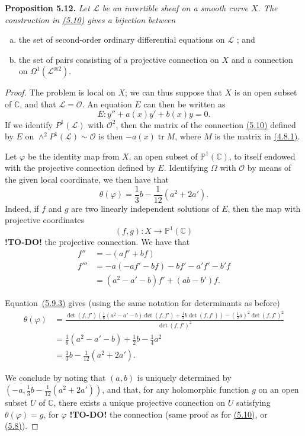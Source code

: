 \documentclass{report}
\newenvironment{itenv}[1]
  {\phantomsection\par\medskip\noindent\textbf{#1.}\itshape}
  {\par\medskip}
\newcommand{\scr}[1]{{\mathscr{#1}}}
\renewcommand{\cal}[1]{{\mathcal{#1}}}
\newcommand{\PP}{\mathbb{P}}
\newcommand{\CC}{\mathbb{C}}
\newcommand{\detrow}[2]{\operatorname{det}(#1,#2)}
\DeclareMathOperator{\tr}{tr}
\newcommand{\todo}{\textbf{ !TO-DO! }}
\newcommand{\oldpage}[1]{\marginpar{\footnotesize$\Big\vert$ \textit{p.~#1}}}
\begin{document}
\begin{itenv}{Proposition 5.12}
\label{I.5.12}
  Let $\scr{L}$ be an invertible sheaf on a smooth curve $X$.
  The construction in \hyperref[I.5.10]{(5.10)} gives a bijection between
  \begin{enumerate}[a)]
    \item the set of second-order ordinary differential equations on $\scr{L}$ ; and
\oldpage{36}
    \item the set of pairs consisting of a projective connection on $X$ and a connection on $\Omega^1(\scr{L}^{\otimes2})$.
  \end{enumerate}
\end{itenv}

\begin{proof}
  The problem is local on $X$;
  we can thus suppose that $X$ is an open subset of $\CC$, and that $\scr{L}=\cal{O}$.
  An equation $E$ can then be written as
  \[
    E\colon y'' + a(x)y' + b(x)y = 0.
  \]
  If we identify $P^1(\scr{L})$ with $\cal{O}^2$, then the matrix of the connection \hyperref[I.5.10]{(5.10)} defined by $E$ on $\wedge^2 P^1(\scr{L})\sim\cal{O}$ is then $-a(x)\tr M$, where $M$ is the matrix in \hyperref[I.4.8.1]{(4.8.1)}.

  Let $\varphi$ be the identity map from $X$, an open subset of $\PP^1(\CC)$, to itself endowed with the projective connection defined by $E$.
  Identifying $\Omega$ with $\cal{O}$ by means of the given local coordinate, we then have that
  \[
  \label{I.5.12.1}
    \theta(\varphi) = \frac13b - \frac{1}{12}(a^2+2a').
  \tag{5.12.1}
  \]
  Indeed, if $f$ and $g$ are two linearly independent solutions of $E$, then the map with projective coordinates
  \[
    (f,g)\colon X\to\PP^1(\CC)
  \]
  \todo the projective connection.
  We have that
  \[
    \begin{aligned}
      f''
      &= -(af'+bf)
    \\f'''
      &= -a(-af'-bf) - bf' - a'f' - b'f
    \\&= (a^2-a'-b)f' + (ab-b')f.
    \end{aligned}
  \]

  Equation~\hyperref[I.5.9.3]{(5.9.3)} gives (using the same notation for determinants as before)
  \[
    \begin{aligned}
      \theta(\varphi)
      &= \frac{
        \detrow{f}{f'}
        \left(
          \frac16(a^2-a'-b)\detrow{f}{f'}
          +\frac12 b\detrow{f}{f'}
        \right)
        - (\frac12a)^2\detrow{f}{f'}^2
      }{
        \detrow{f}{f'}^2
      }
    \\&= \frac16(a^2-a'-b) + \frac12 b - \frac14 a^2
    \\&= \frac13 b - \frac{1}{12}(a^2+2a').
    \end{aligned}
  \]

  We conclude by noting that $(a,b)$ is uniquely determined by $(-a,\frac13b-\frac{1}{12}(a^2+2a'))$, and that, for any holomorphic function $g$ on an open subset $U$ of $\CC$, there exists a unique projective connection on $U$ satisfying $\theta(\varphi)=g$, for $\varphi$ \todo the connection (same proof as for \hyperref[I.5.10]{(5.10)}, or \hyperref[I.5.8]{(5.8)}).
\end{proof}
\end{document}
